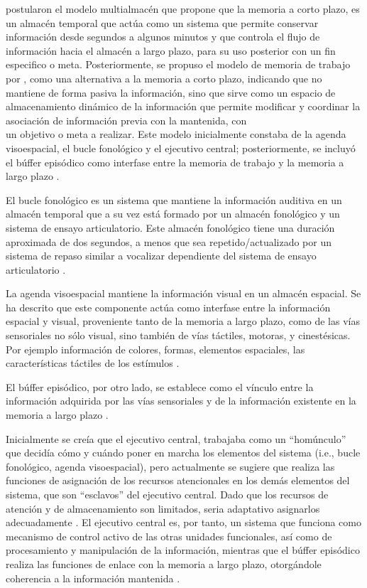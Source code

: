 \documentclass[12pt,letterpaper,final]{article}
\let\cite\cite %
\begin{document}
 postularon el modelo multialmacén que propone que la memoria a corto plazo, es un almacén temporal que actúa como un sistema que permite conservar información desde segundos a algunos minutos y que controla el flujo de información hacia el almacén a largo plazo, para  su uso posterior con un fin especifico o meta.
Posteriormente, se propuso el modelo de memoria de trabajo por , como una alternativa a la memoria a corto plazo, indicando que no mantiene de forma pasiva la información, sino que sirve como un espacio de almacenamiento dinámico de la información que permite modificar y coordinar la asociación de información previa con la mantenida, con \\
un objetivo o meta a realizar. Este modelo inicialmente constaba de la agenda visoespacial, el bucle fonológico y el ejecutivo central; posteriormente, se incluyó el búffer episódico como interfase entre la memoria de trabajo y la memoria a largo plazo \cite{Baddeley2001,Baddeley1974}.



El bucle fonológico es un sistema que mantiene la información auditiva en un almacén temporal que a su vez está formado por un almacén fonológico y un sistema de ensayo articulatorio. Este almacén fonológico tiene una duración aproximada de dos segundos, a menos que sea repetido/actualizado por un sistema de repaso similar a vocalizar dependiente del sistema de ensayo articulatorio \cite{Baddeley2001}.

La agenda visoespacial mantiene la información visual en un almacén espacial. Se ha descrito que este componente actúa como interfase entre la información espacial y visual, proveniente tanto de la memoria a largo plazo, como de las vías sensoriales no sólo visual, sino también de vías táctiles, motoras, y cinestésicas. Por ejemplo información de colores, formas, elementos espaciales, las características táctiles de los estímulos \cite{Baddeley2001}.

El búffer episódico, por otro lado, se establece como el vínculo entre la información adquirida por las vías sensoriales y de la información existente en la memoria a largo plazo \cite{Baddeley2001}.

Inicialmente se creía que el ejecutivo central, trabajaba como un ``homúnculo'' que decidía cómo y cuándo poner en marcha los elementos del sistema (i.e., bucle fonológico, agenda visoespacial), pero actualmente se sugiere que realiza las funciones de asignación de los recursos atencionales en los demás elementos del sistema, que son ``esclavos''  del ejecutivo central. Dado que los recursos de atención y de almacenamiento son limitados, seria adaptativo asignarlos adecuadamente \cite{Baddeley2001}. 
El ejecutivo central es, por tanto, un sistema que funciona como mecanismo de control activo de las otras unidades funcionales, así como de procesamiento y manipulación de la información,  mientras que el búffer episódico realiza las funciones de enlace con la memoria a largo plazo, otorgándole coherencia a la información mantenida \cite{Baddeley2001}. 
\end{document}
